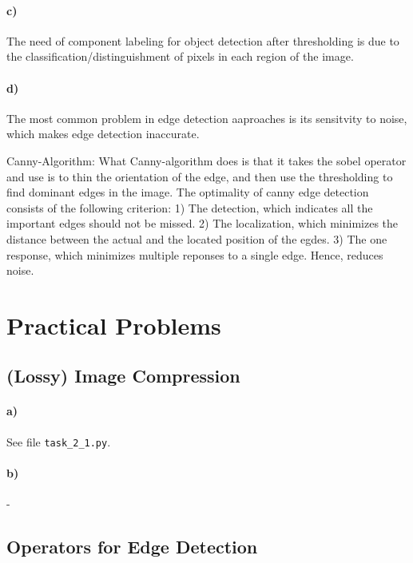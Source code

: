 \documentclass[a4paper,twocolumn]{article}
\begin{document}
	\paragraph{c)} %
	
	The need of component labeling for object detection after thresholding is due to the classification/distinguishment of pixels in each region of the image.
	
	\paragraph{d)} %

	The most common problem in edge detection aaproaches is its sensitvity to noise, which makes edge detection inaccurate.
	
	Canny-Algorithm:
	What Canny-algorithm does is that it takes the sobel operator and use is to thin the orientation of the edge, and then use the thresholding to find dominant edges in the image.
	The optimality of canny edge detection consists of the following criterion:
	1) The detection, which indicates all the important edges should not be missed.
	2) The localization, which minimizes the distance between the actual and the located position of the egdes.
	3) The one response, which minimizes multiple reponses to a single edge. Hence, reduces noise.
	
	
	\section{Practical Problems}
	
	\subsection{(Lossy) Image Compression}
	
	\paragraph{a)} See file \texttt{task\_2\_1.py}.
	
	\vspace{12pt}
	
	\paragraph{b)} -
	
	\vspace{12pt}
	
	\subsection{Operators for Edge Detection}
	
\end{document}

